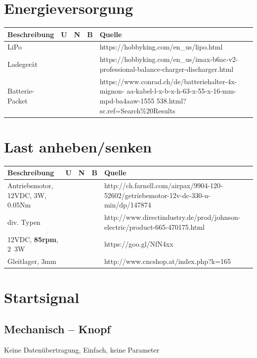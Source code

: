 \documentclass[a4paper]{report}
\begin{document}
\section{Energieversorgung}
\vspace{1em}
\noindent
\begin{tabular}{|p{}|p{}|p{}|p{}|p{}|}
	\hline
	\textbf{Beschreibung} & \textbf{U} & \textbf{N} & \textbf{B} & \textbf{Quelle} \\
	\hline
	LiPo & & & & https://hobbyking.com/en\_us/lipo.html \\
	\hline
	Ladegerät & & & & https://hobbyking.com/en\_us/imax-b6ac-v2-professional-balance-charger-discharger.html \\
	\hline
	Batterie-Packet & & & & https://www.conrad.ch/de/batteriehalter-4x-mignon-
	aa-kabel-l-x-b-x-h-63-x-55-x-16-mm-mpd-ba4aaw-1555
	538.html?sc.ref=Search\%20Results
	\\
	\hline
\end{tabular}

\section{Last anheben/senken}
\begin{tabular}{|p{}|p{}|p{}|p{}|p{}|}
	\hline
	\textbf{Beschreibung} & \textbf{U} & \textbf{N} & \textbf{B} & \textbf{Quelle} \\
	\hline
	Antriebsmotor, 12VDC, 3W, 0.05Nm & & & &
	http://ch.farnell.com/airpax/9904-120-52602/getriebemotor-12v-dc-330-u-min/dp/147874  \\
	\hline
	div. Typen & & & & http://www.directindustry.de/prod/johnson-electric/product-665-470175.html\\
	\hline
	12VDC, \textbf{85rpm}, 2~3W & & & & https://goo.gl/NfN4xx\\
	\hline
	Gleitlager, 3mm & & & & http://www.cncshop.at/index.php?k=165\\
	\hline
\end{tabular}

\section{Startsignal}
\subsection{Mechanisch – Knopf}
Keine Datenübertragung, Einfach, keine Parameter
\end{document}

